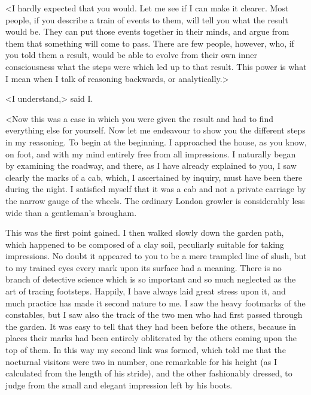 <I hardly expected that you would. Let me see if I can make it clearer. Most people, if you describe a train of events to them, will tell you what the result would be. They can put those events together in their minds, and argue from them that something will come to pass. There are few people, however, who, if you told them a result, would be able to evolve from their own inner consciousness what the steps were which led up to that result. This power is what I mean when I talk of reasoning backwards, or analytically.>

<I understand,> said I\@.

<Now this was a case in which you were given the result and had to find everything else for yourself. Now let me endeavour to show you the different steps in my reasoning. To begin at the beginning. I approached the house, as you know, on foot, and with my mind entirely free from all impressions. I naturally began by examining the roadway, and there, as I have already explained to you, I saw clearly the marks of a cab, which, I ascertained by inquiry, must have been there during the night. I satisfied myself that it was a cab and not a private carriage by the narrow gauge of the wheels. The ordinary London growler is considerably less wide than a gentleman's brougham.

This was the first point gained. I then walked slowly down the garden path, which happened to be composed of a clay soil, peculiarly suitable for taking impressions. No doubt it appeared to you to be a mere trampled line of slush, but to my trained eyes every mark upon its surface had a meaning. There is no branch of detective science which is so important and so much neglected as the art of tracing footsteps. Happily, I have always laid great stress upon it, and much practice has made it second nature to me. I saw the heavy footmarks of the constables, but I saw also the track of the two men who had first passed through the garden. It was easy to tell that they had been before the others, because in places their marks had been entirely obliterated by the others coming upon the top of them. In this way my second link was formed, which told me that the nocturnal visitors were two in number, one remarkable for his height (as I calculated from the length of his stride), and the other fashionably dressed, to judge from the small and elegant impression left by his boots.

